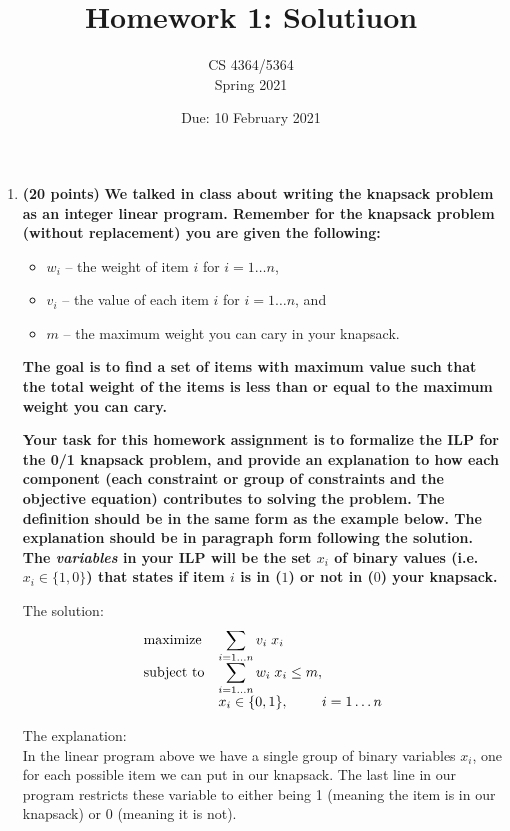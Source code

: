 \documentclass[11pt, oneside]{article}   	%
\title{Homework 1: Solutiuon}
\author{CS 4364/5364\\Spring 2021}
\date{Due: 10 February 2021}							%
\begin{document}
\maketitle


\begin{enumerate}
\item \textbf{(20 points)} 
\textbf{We talked in class about writing the knapsack problem as an integer linear program. 
Remember for the knapsack problem (without replacement) you are given the following:}
\begin{itemize}
\item $w_{i}$ -- the weight of item $i$ for $i = 1 \dots n$, 
\item $v_{i}$ -- the value of each item $i$ for $i = 1 \dots n$, and 
\item $m$ -- the maximum weight you can cary in your knapsack. 
\end{itemize}

\textbf{The goal is to find a set of items with maximum value such that the total weight of the items is less than or equal to the maximum weight you can cary. }

\textbf{Your task for this homework assignment is to formalize the ILP for the 0/1 knapsack problem, 
and provide an explanation to how each component (each constraint or group of constraints and the objective equation) 
contributes to solving the problem. 
The definition should be in the same form as the example below. 
The explanation should be in paragraph form following the solution. 
The \emph{variables} in your ILP will be the set $x_{i}$ of binary values (i.e. $x_{i} \in \{1,0\}$) that states if item $i$ is in ($1$) or not in ($0$) your knapsack.}

{\Large The solution:}\\
\begin{equation*}
\begin{array}{ll@{}ll}
\text{maximize}  & \displaystyle\sum_{i = 1 \dots n}  v_{i} \; x_{i}\\
\text{subject to}&  \displaystyle\sum_{i = 1 \dots n}  w_{i} \; x_{i} \leq m,  &\\
			& x_{i} \in  \{0,1\}, & i = 1 \dots n
\end{array}
\end{equation*}


{\Large The explanation:}\\
In the linear program above we have a single group of binary variables $x_{i}$, one for each possible item we can put in our knapsack. 
The last line in our program restricts these variable to either being 1 (meaning the item is in our knapsack) or 0 (meaning it is not). 


\end{enumerate}
\end{document}
